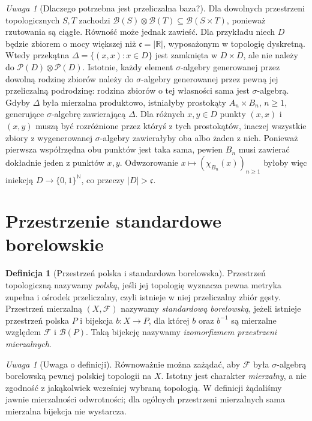 \documentclass[11pt,a4paper,oneside]{book}
\numberwithin{equation}{chapter}
\theoremstyle{plain}
\theoremstyle{definition}
\newtheorem{definicja}[twierdzenie]{Definicja}
\theoremstyle{remark}
\newtheorem{uwaga}[twierdzenie]{Uwaga}
\begin{document}
\begin{uwaga}[Dlaczego potrzebna jest przeliczalna baza?]
Dla dowolnych przestrzeni topologicznych $S,T$ zachodzi
$\mathcal B(S)\otimes\mathcal B(T)\subseteq\mathcal B(S\times T)$,
ponieważ rzutowania są ciągłe. Równość może jednak zawieść.
Dla przykładu niech $D$ będzie zbiorem o mocy większej niż
$\mathfrak c=|\mathbb R|$, wyposażonym w topologię dyskretną.
Wtedy przekątna $\Delta=\{(x,x):x\in D\}$ jest zamknięta
w $D\times D$, ale nie należy do
$\mathcal P(D)\otimes\mathcal P(D)$.
Istotnie, każdy element $\sigma$-algebry generowanej
przez dowolną rodzinę zbiorów należy do $\sigma$-algebry
generowanej przez pewną jej przeliczalną podrodzinę:
rodzina zbiorów o tej własności sama jest $\sigma$-algebrą.
Gdyby $\Delta$ była mierzalna produktowo, istniałyby
prostokąty $A_n\times B_n$, $n\ge1$, generujące
$\sigma$-algebrę zawierającą $\Delta$.
Dla różnych $x,y\in D$ punkty $(x,x)$ i $(x,y)$
muszą być rozróżnione przez któryś z tych prostokątów,
inaczej wszystkie zbiory z wygenerowanej $\sigma$-algebry
zawierałyby oba albo żaden z nich. Ponieważ pierwsza
współrzędna obu punktów jest taka sama, pewien $B_n$
musi zawierać dokładnie jeden z punktów $x,y$.
Odwzorowanie $x\mapsto(\chi_{B_n}(x))_{n\ge1}$
byłoby więc iniekcją $D\to\{0,1\}^{\mathbb N}$, co
przeczy $|D|>\mathfrak c$.
\end{uwaga}

\section{Przestrzenie standardowe borelowskie}

\begin{definicja}[Przestrzeń polska i standardowa borelowska]
\label{def:standard-borel}
Przestrzeń topologiczną nazywamy \emph{polską}, jeśli
jej topologię wyznacza pewna metryka zupełna i ośrodek
przeliczalny, czyli istnieje w niej przeliczalny zbiór
gęsty. Przestrzeń mierzalną $(X,\mathcal F)$ nazywamy
\emph{standardową borelowską}, jeżeli istnieje przestrzeń
polska $P$ i bijekcja $b:X\to P$, dla której
$b$ oraz $b^{-1}$ są mierzalne względem
$\mathcal F$ i $\mathcal B(P)$. Taką bijekcję
nazywamy \emph{izomorfizmem przestrzeni mierzalnych}.
\end{definicja}

\begin{uwaga}[Uwaga o definicji]
Równoważnie można zażądać, aby $\mathcal F$ była
$\sigma$-algebrą borelowską pewnej polskiej topologii na $X$.
Istotny jest charakter \emph{mierzalny}, a nie zgodność
z jakąkolwiek wcześniej wybraną topologią. W definicji
żądaliśmy jawnie mierzalności odwrotności; dla ogólnych
przestrzeni mierzalnych sama mierzalna bijekcja nie wystarcza.
\end{uwaga}
\end{document}
